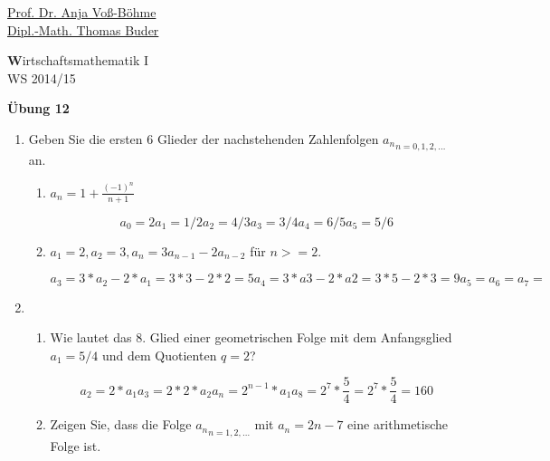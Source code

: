 \documentclass[12pt,a4paper]{scrreprt}
\newcommand{\N}{\mathds{N}}
\begin{document}
 
\begin{flushleft}
\href{mailto:anja.voss-boehme@htw-dresden.de}{Prof. Dr. Anja Voß-Böhme} \\
\href{mailto:buder@htw-dresden.de}{Dipl.-Math. Thomas Buder}
\end{flushleft}

\begin{center}{\large\textbf Wirtschaftsmathematik I} \\ WS 2014/15 \end{center}

\begin{center}{\large\textbf{Übung 12}} 
\end{center}


\bigskip

\begin{enumerate}

\item Geben Sie die ersten 6 Glieder der nachstehenden Zahlenfolgen ${a_n }_{n=0,1,2,\ldots} $
an.

\begin{enumerate}

\item $a_n = 1 + \frac{(-1)^n}{n+1}$

\[
a_0 = 2
a_1 = 1/2
a_2 = 4/3
a_3 = 3/4
a_4 = 6/5
a_5 = 5/6
\]

\item $a_1=2, a_2=3, a_n=3a_{n-1}-2a_{n-2}$ für $n>=2$.

\[
a_3 = 3*a_2-2*a_1 = 3*3 - 2*2 = 5
a_4 = 3*a3 - 2*a2 = 3*5 - 2*3 = 9
a_5 = 
a_6 = 
a_7 = 
\]

\end{enumerate}

\item  \begin{enumerate}

Geometr. Folge: Hier ist der Nachfolger ein Vielfaches des Vorgängers.

\[
{a_{n+1}}{a_n} = c, c konst. f. alle n \in \N
\]

\item Wie lautet das 8. Glied einer geometrischen Folge mit dem Anfangsglied
$a_1 = 5/4$ und dem Quotienten $q = 2$?

\[
a_2 = 2*a_1
a_3 = 2*2*a_2
a_n = 2^{n-1}*a_1
a_8 = 2^7*\frac{5}{4}=2^7*\frac{5}{4}=160
\]

\item Zeigen Sie, dass die Folge ${a_n}_{n=1,2,\ldots}$ mit $a_n = 2n - 7$ eine arithmetische
Folge ist.


\end{enumerate}
\end{enumerate}
\end{document}
